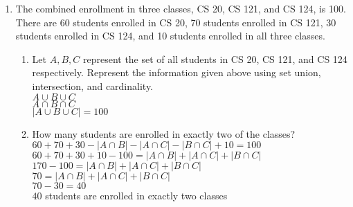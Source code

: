 \documentclass[12pt]{article}
\begin{document}
\begin{enumerate}
\begin{enumerate}
\end{enumerate}
\item The combined enrollment in three classes, CS 20, CS 121, and CS 124, is 100. There are 60 students enrolled in CS 20, 70 students enrolled in CS 121, 30 students enrolled in CS 124, and 10 students enrolled in all three classes.\begin{enumerate}
\item Let $A,B,C$ represent the set of all students in CS 20, CS 121, and CS 124 respectively. Represent the information given above using set union, intersection, and cardinality. \\
    $A \cup B \cup C$  \\
    $A \cap B \cap C$ \\
    $|A \cup B \cup C| = 100$ \\
\item How many students are enrolled in exactly two of the classes? \\
    $60 + 70 + 30 - |A \cap B| - |A \cap C| - |B \cap C| + 10 = 100$ \\
    $60 + 70 + 30 + 10 - 100 = |A \cap B| + |A \cap C| + |B \cap C|$ \\
    $170 - 100 = |A \cap B| + |A \cap C| + |B \cap C|$ \\
    $70 = |A \cap B| + |A \cap C| + |B \cap C|$ \\
    $70 - 30 = 40$ \\
    $40$ students are enrolled in exactly two classes

\end{enumerate}
\end{enumerate}
\pagebreak
\end{document}
